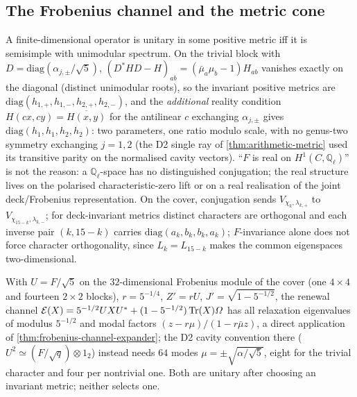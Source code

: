 \subsection{The Frobenius channel and the metric cone}

\begin{proposition}
\label{prop:genus-two-metric-cone}
A finite-dimensional operator is unitary in some positive metric iff it is semisimple with unimodular spectrum. On the
trivial block with $D = \mathrm{diag}(\alpha_{j,\pm}/\sqrt5)$, $(D^{*}HD-H)_{ab} = (\bar\mu_a\mu_b-1)H_{ab}$ vanishes exactly on the
diagonal (distinct unimodular roots), so the invariant positive metrics are $\mathrm{diag}(h_{1,+},h_{1,-},h_{2,+},h_{2,-})$, and the
\emph{additional} reality condition $H(cx,cy) = \overline{H(x,y)}$ for the antilinear $c$ exchanging $\alpha_{j,\pm}$ gives
$\mathrm{diag}(h_1,h_1,h_2,h_2)$: two parameters, one ratio modulo scale, with no genus-two symmetry exchanging $j = 1,2$
(the D2 single ray of \cref{thm:arithmetic-metric} used its transitive parity on the normalised cavity vectors).
``$F$ is real on $H^1(C,\mathbb Q_\ell)$'' is not the reason: a $\mathbb Q_\ell$-space has no distinguished conjugation; the real
structure lives on the polarised characteristic-zero lift or on a real realisation of the joint deck/Frobenius
representation. On the cover, conjugation sends $V_{\chi_k,\lambda_{k,+}}$ to $V_{\chi_{15-k},\lambda_{k,-}}$; for deck-invariant
metrics distinct characters are orthogonal and each inverse pair $(k,15-k)$ carries $\mathrm{diag}(a_k,b_k,b_k,a_k)$;
$F$-invariance alone does not force character orthogonality, since $L_k = L_{15-k}$ makes the common eigenspaces
two-dimensional.
\end{proposition}

\begin{proposition}
\label{prop:genus-two-frobenius-channel}
With $U = F/\sqrt5$ on the $32$-dimensional Frobenius module of the cover (one $4\times4$ and fourteen $2\times2$ blocks), $r = 5^{-1/4}$,
$Z' = rU$, $J' = \sqrt{1-5^{-1/2}}$, the renewal channel $\mathcal E(X) = 5^{-1/2}UXU^{*}+(1-5^{-1/2})\operatorname{Tr}(X)\varOmega$ has all relaxation
eigenvalues of modulus $5^{-1/2}$ and modal factors $(z-r\mu)/(1-r\bar\mu z)$, a direct application of
\cref{thm:frobenius-channel-expander}; the D2 cavity convention there ($U^2\simeq(F/\sqrt q)\otimes1_2$) instead needs $64$
modes $\mu = \pm\sqrt{\alpha/\sqrt5}$, eight for the trivial character and four per nontrivial one. Both are unitary after
choosing an invariant metric; neither selects one.
\end{proposition}

